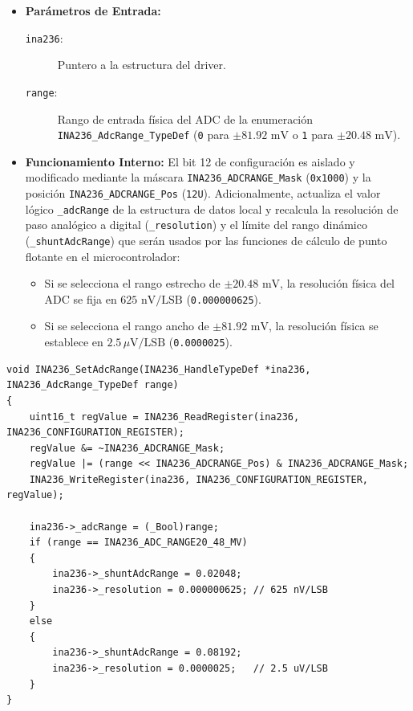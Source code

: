 \documentclass[
10pt, %
a4paper, %
oneside, %
headinclude,footinclude, %
BCOR5mm, %
]{scrartcl}
\begin{document}
\begin{itemize}
	\item \textbf{Parámetros de Entrada:}
		\begin{description}
			\item[\texttt{ina236}:] Puntero a la estructura del driver.
			\item[\texttt{range}:] Rango de entrada física del ADC de la enumeración \texttt{INA236\_AdcRange\_TypeDef} (\texttt{0} para $\pm 81.92\text{ mV}$ o \texttt{1} para $\pm 20.48\text{ mV}$).
		\end{description}
	\item \textbf{Funcionamiento Interno:}
		El bit 12 de configuración es aislado y modificado mediante la máscara \texttt{INA236\_ADCRANGE\_Mask} (\texttt{0x1000}) y la posición \texttt{INA236\_ADCRANGE\_Pos} (\texttt{12U}).
		Adicionalmente, actualiza el valor lógico \texttt{\_adcRange} de la estructura de datos local y recalcula la resolución de paso analógico a digital (\texttt{\_resolution}) y el límite del rango dinámico (\texttt{\_shuntAdcRange}) que serán usados por las funciones de cálculo de punto flotante en el microcontrolador:
		\begin{itemize}
			\item Si se selecciona el rango estrecho de $\pm 20.48\text{ mV}$, la resolución física del ADC se fija en $625\text{ nV/LSB}$ (\texttt{0.000000625}).
			\item Si se selecciona el rango ancho de $\pm 81.92\text{ mV}$, la resolución física se establece en $2.5\,\mu\text{V/LSB}$ (\texttt{0.0000025}).
		\end{itemize}
\end{itemize}

\begin{lstlisting}[style=CMakeStyle]
void INA236_SetAdcRange(INA236_HandleTypeDef *ina236, INA236_AdcRange_TypeDef range)
{
    uint16_t regValue = INA236_ReadRegister(ina236, INA236_CONFIGURATION_REGISTER);
    regValue &= ~INA236_ADCRANGE_Mask;
    regValue |= (range << INA236_ADCRANGE_Pos) & INA236_ADCRANGE_Mask;
    INA236_WriteRegister(ina236, INA236_CONFIGURATION_REGISTER, regValue);
    
    ina236->_adcRange = (_Bool)range;
    if (range == INA236_ADC_RANGE20_48_MV)
    {
        ina236->_shuntAdcRange = 0.02048;
        ina236->_resolution = 0.000000625; // 625 nV/LSB
    }
    else
    {
        ina236->_shuntAdcRange = 0.08192;
        ina236->_resolution = 0.0000025;   // 2.5 uV/LSB
    }
}
\end{lstlisting}
\end{document}
